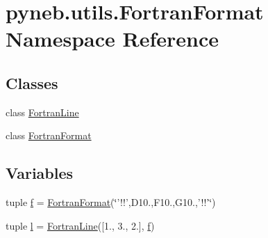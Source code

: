 \hypertarget{namespacepyneb_1_1utils_1_1_fortran_format}{\section{pyneb.\-utils.\-Fortran\-Format Namespace Reference}
\label{namespacepyneb_1_1utils_1_1_fortran_format}
}
\subsection*{Classes}
\begin{DoxyCompactItemize}
\item 
class \hyperlink{classpyneb_1_1utils_1_1_fortran_format_1_1_fortran_line}{Fortran\-Line}
\item 
class \hyperlink{classpyneb_1_1utils_1_1_fortran_format_1_1_fortran_format}{Fortran\-Format}
\end{DoxyCompactItemize}
\subsection*{Variables}
\begin{DoxyCompactItemize}
\item 
tuple \hyperlink{namespacepyneb_1_1utils_1_1_fortran_format_a85d897846bb64fe74a8ce36c2365e3b8}{f} = \hyperlink{classpyneb_1_1utils_1_1_fortran_format_1_1_fortran_format}{Fortran\-Format}(\char`\"{}'!!',D10.,F10.,G10.,'!!'\char`\"{})
\item 
tuple \hyperlink{namespacepyneb_1_1utils_1_1_fortran_format_abc599b1f87ca3a4e0ff709091fb25176}{l} = \hyperlink{classpyneb_1_1utils_1_1_fortran_format_1_1_fortran_line}{Fortran\-Line}(\mbox{[}1., 3., 2.\mbox{]}, \hyperlink{namespacepyneb_1_1utils_1_1_fortran_format_a85d897846bb64fe74a8ce36c2365e3b8}{f})
\end{DoxyCompactItemize}


